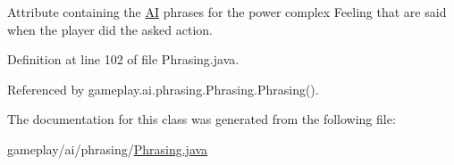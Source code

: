 Attribute containing the \hyperlink{classgameplay_1_1ai_1_1_a_i}{A\-I} phrases for the power complex Feeling that are said when the player did the asked action. 



Definition at line 102 of file Phrasing.\-java.



Referenced by gameplay.\-ai.\-phrasing.\-Phrasing.\-Phrasing().



The documentation for this class was generated from the following file\-:\begin{DoxyCompactItemize}
\item 
gameplay/ai/phrasing/\hyperlink{_phrasing_8java}{Phrasing.\-java}\end{DoxyCompactItemize}
